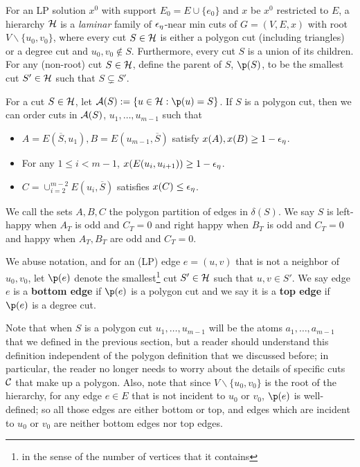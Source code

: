 \begin{definition}[Hierarchy]\label{def:hierarchy}
\hypertarget{tar:hierarchy}{For an LP solution $x^0$ with support $E_0=E\cup \{e_0\}$ and $x$ be $x^0$ restricted to $E$,  a hierarchy ${\cal H}$ is a {\em laminar} family of ${\epsilon}_\eta$-near min cuts of $G=(V,E,x)$ with root $V\smallsetminus \{u_0,v_0\}$, where every cut $S\in \mathcal{H}$  is either a polygon cut (including triangles) or a degree cut and $u_0,v_0\notin S$. Furthermore, every cut $S$ is a union of its children.
For any (non-root) cut $S\in \mathcal{H}$, define the parent of $S$, $\p(S)$, to be the smallest cut $S'\in\mathcal{H}$ such that $S\subsetneq S'$.}

\hypertarget{tar:AS}{For a cut $S\in \mathcal{H}$, 
let $\cA(S):=\{u\in \cH: \p(u)=S\}$. If $S$ is a polygon cut, then we can order cuts in ${\cal A}(S)$, $u_1,\dots,u_{m-1}$ such that 
\begin{itemize}
\item $A=E(\overline{S},u_1), B=E(u_{m-1},\overline{S})$ satisfy $x(A),x(B)\geq 1-{\epsilon}_\eta$.
\item For any $1\leq i<m-1$, $x(E(u_i,u_{i+1}))\geq 1-{\epsilon}_\eta$.
\item $C=\cup_{i=2}^{m-2} E(u_i,\overline{S})$ satisfies $x(C)\leq {\epsilon}_\eta$.
\end{itemize}}

We call the sets $A,B,C$ the polygon partition of edges in $\delta(S)$. We say $S$ is left-happy when $A_T$ is odd and  $C_T=0$ and right happy when $B_T$ is odd and $C_T=0$ and happy when $A_T,B_T$ are odd and $C_T=0$.

We abuse notation, and for an (LP) edge $e=(u,v)$ that is not a neighbor of $u_0,v_0$, let $\p(e)$ denote the smallest\footnote{in the sense of the number of vertices that it contains} cut $S'\in \mathcal{H}$ such that $u,v\in S'$. We say edge $e$ is a \textbf{bottom edge} if $\p(e)$ is a polygon cut and we say it is a \textbf{top edge} if $\p(e)$ is a degree cut.
\end{definition}
Note that when $S$ is a polygon cut $u_1,\dots,u_{m-1}$ will be the atoms $a_1,\dots,a_{m-1}$ that we defined in the previous section, but a reader should understand this definition independent of the polygon definition that we discussed before; in particular, the reader no longer needs to worry about the details of specific cuts ${\cal C}$ that make up a polygon. 
Also, note that since $V\smallsetminus \{u_0,v_0\}$ is the root of the hierarchy, for any edge $e\in E$ that is not incident  to $u_0$ or $v_0$, $\p(e)$ is well-defined; so all those edges are either bottom or top, and edges which are incident to $u_0$ or $v_0$ are neither bottom edges nor top edges.

